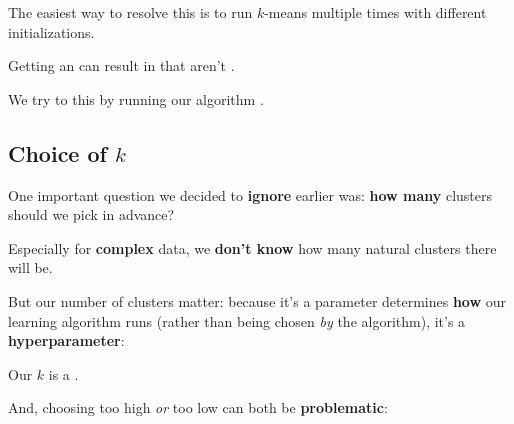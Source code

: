         The easiest way to resolve this is to run $k$-means multiple times with different initializations.
            \\
        
        \begin{concept}
            Getting an  can result in  that aren't .
            
            We try to  this by running our algorithm .
        \end{concept}
        
        
    \subsection{Choice of $k$}
    
        One important question we decided to \textbf{ignore} earlier was: \textbf{how many} clusters should we pick in advance?
        
        Especially for \textbf{complex} data, we \textbf{don't know} how many natural clusters there will be. 
        
        But our number of clusters matter: because it's a parameter determines \textbf{how} our learning algorithm runs (rather than being chosen \textit{by} the algorithm), it's a \textbf{hyperparameter}:\\
        
        \begin{concept}
            Our  $k$ is a .
        \end{concept}
        
        And, choosing too high \textit{or} too low can both be \textbf{problematic}:
        
